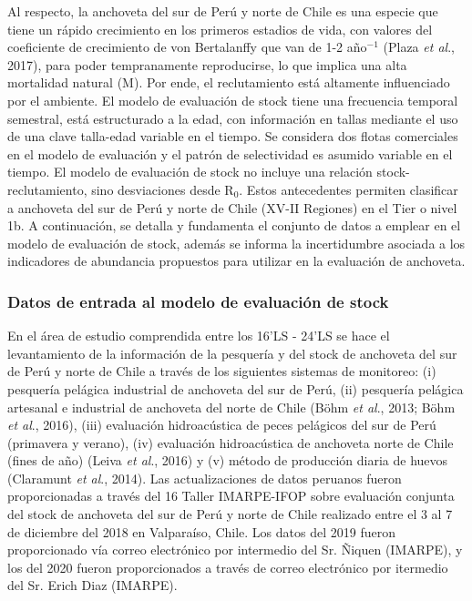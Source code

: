 \documentclass[letter,11pt]{article}
\begin{document}
Al respecto, la anchoveta del sur de Per\'u y norte de Chile es una
especie que tiene un r\'apido crecimiento en los primeros estadios de
vida, con valores del coeficiente de crecimiento de von Bertalanffy que
van de 1-2 a\~{n}o$^{-1}$ (Plaza \textit{et al}., 2017), para poder
tempranamente reproducirse, lo que implica una alta mortalidad natural
(M). Por ende, el reclutamiento est\'a altamente influenciado por el
ambiente. El modelo de evaluaci\'on de stock tiene una frecuencia temporal
semestral, est\'a estructurado a la edad, con informaci\'on en tallas
mediante el uso de una clave talla-edad variable en el tiempo. Se
considera dos flotas comerciales en el modelo de evaluaci\'on y el patr\'on
de selectividad es asumido variable en el tiempo. El modelo de
evaluaci\'on de stock no incluye una relaci\'on stock-reclutamiento, sino
desviaciones desde R$_{0}$. Estos antecedentes permiten clasificar a
anchoveta del sur de Per\'u y norte de Chile (XV-II Regiones) en el Tier o
nivel 1b. A continuaci\'on, se detalla y fundamenta el conjunto de datos a
emplear en el modelo de evaluaci\'on de stock, adem\'as se informa la
incertidumbre asociada a los indicadores de abundancia propuestos para
utilizar en la evaluaci\'on de anchoveta.


\subsubsection{Datos de entrada al modelo de evaluaci\'on de stock}

En el \'area de estudio comprendida entre los 16'LS -
24'LS se hace el levantamiento de la informaci\'on de la
pesquer\'ia y del stock de anchoveta del sur de Per\'u y norte de Chile a
trav\'es de los siguientes sistemas de monitoreo: (i) pesquer\'ia pel\'agica
industrial de anchoveta del sur de Per\'u, (ii) pesquer\'ia pel\'agica
artesanal e industrial de anchoveta del norte de Chile (B\"ohm
\textit{et al}., 2013; B\"ohm \textit{et al}., 2016), (iii) evaluaci\'on
hidroac\'ustica de peces pel\'agicos del sur de Per\'u (primavera y verano),
(iv) evaluaci\'on hidroac\'ustica de anchoveta norte de Chile (fines de a\~{n}o)
(Leiva \textit{et al}., 2016) y (v) m\'etodo de producci\'on diaria de
huevos (Claramunt \textit{et al}., 2014). Las actualizaciones de datos
peruanos fueron proporcionadas a trav\'es del 16 Taller IMARPE-IFOP sobre
evaluaci\'on conjunta del stock de anchoveta del sur de Per\'u y norte de
Chile realizado entre el 3 al 7 de diciembre del 2018 en Valpara\'iso,
Chile. Los datos del 2019 fueron proporcionado v\'ia correo electr\'onico
por intermedio del Sr. \~{N}iquen (IMARPE), y los del 2020 fueron
proporcionados a trav\'es de correo electr\'onico por itermedio del
Sr. Erich Diaz (IMARPE).
\end{document}
